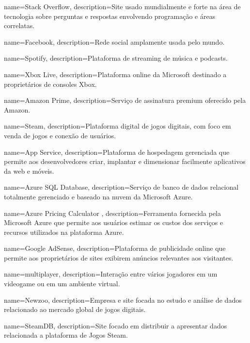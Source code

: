  {
    name=Stack Overflow,
    description={Site usado mundialmente e forte na área de tecnologia sobre perguntas e respostas envolvendo programação e áreas correlatas.}
}

 {
    name=Facebook,
    description={Rede social amplamente usada pelo mundo.}
}

 {
    name=Spotify,
    description={Plataforma de streaming de música e podcasts.}
}

 {
    name=Xbox Live,
    description={Plataforma online da Microsoft destinado a proprietários de consoles Xbox.}
}

 {
    name=Amazon Prime,
    description={Serviço de assinatura premium oferecido pela Amazon.}
}

 {
    name=Steam,
    description={Plataforma digital de jogos digitais, com foco em venda de jogos e conexão de usuários.}
}

 {
    name=App Service,
    description={Plataforma de hospedagem gerenciada que permite aos desenvolvedores criar, implantar e dimensionar facilmente aplicativos da web e móveis.}
}

 {
    name=Azure SQL Database,
    description={Serviço de banco de dados relacional totalmente gerenciado e baseado na nuvem da Microsoft Azure.}
}

 {
    name=Azure Pricing Calculator ,
    description={Ferramenta fornecida pela Microsoft Azure que permite aos usuários estimar os custos dos serviços e recursos utilizados na plataforma Azure.}
}

 {
    name=Google AdSense,
    description={Plataforma de publicidade online que permite aos proprietários de sites exibirem anúncios relevantes aos visitantes.}
}

 {
    name=multiplayer,
    description={Interação entre vários jogadores em um videogame ou em um ambiente virtual.}
}

 {
    name=Newzoo,
    description={Empresa e site focada no estudo e análise de dados relacionado ao mercado global de jogos digitais.}
}

 {
    name=SteamDB,
    description={Site focado em distribuir a apresentar dados relacionada a plataforma de Jogos \gls{Steam}.}
}

